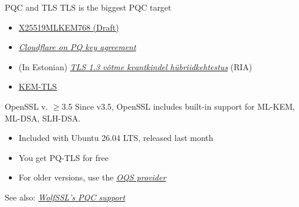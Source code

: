 \begin{frame}{PQC and TLS}
  TLS is the biggest PQC target
  \begin{itemize}[<+(1)->]
    \item \href{https://datatracker.ietf.org/doc/draft-ietf-tls-ecdhe-mlkem/}{X25519MLKEM768 (Draft)}
    \item \href{https://pq.cloudflareresearch.com}{\textit{Cloudflare on PQ key agreement}}
    \item (In Estonian) \href{https://www.ria.ee/blogi/tls-13-votme-kvantkindel-hubriidkehtestus-x25519mlkem768}{\textit{TLS 1.3 võtme kvantkindel hübriidkehtestus}} (RIA)
    \item \href{https://blog.cloudflare.com/kemtls-post-quantum-tls-without-signatures/}{KEM-TLS}
  \end{itemize}
\end{frame}

\begin{frame}{OpenSSL v. $\ge$3.5}
  Since v3.5, OpenSSL includes built-in support for ML-KEM, ML-DSA, SLH-DSA.
  \begin{itemize}[<+(1)->]
    \item Included with Ubuntu 26.04 LTS, released last month
    \item You get PQ-TLS for free
    \item For older versions, use the \href{https://openquantumsafe.org}{\textit{OQS provider}}
  \end{itemize}

  \vspace*{1em}

  \pause
  See also: \href{https://www.wolfssl.com/products/wolfcrypt-post-quantum/}{\textit{WolfSSL's PQC support}}
\end{frame}

